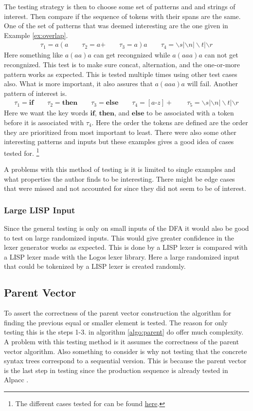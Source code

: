 \documentclass[a4paper,12pt]{article}
\theoremstyle{definition}
\begin{document}
The testing strategy is then to choose some set of patterns and and strings of interest. Then compare if the sequence of tokens with their spans are the same. One of the set of patterns that was deemed interesting are the one given in Example \ref{ex:overlap}.
\begin{align*}
  \tau_1 = a(a \qquad \tau_2 = a\text{+} \qquad \tau_3 = a)a \qquad \tau_4 = \backslash s|\backslash n |\backslash t | \backslash r
\end{align*}
Here something like $a(aa)a$ can get recongnized while $a(aaa)a$ can not get recongnized. This test is to make sure concat, alternation, and the one-or-more pattern works as expected. This is tested multiple times using other test cases also. What is more important, it also assures that $a(aaa)a$ will fail. Another pattern of interest is.
\begin{align*}
  \tau_1 = \mathbf{if} \qquad \tau_2 = \mathbf{then} \qquad \tau_3 = \mathbf{else} \qquad \tau_4 = [a\text{-}z]+ \qquad \tau_5 = \backslash s|\backslash n |\backslash t | \backslash r
\end{align*}
Here we want the key words $\mathbf{if}$, $\mathbf{then}$, and $\mathbf{else}$ to be associated with a token before it is associated with $\tau_4$. Here the order the tokens are defined are the order they are prioritized from most important to least. There were also some other interesting patterns and inputs but these examples gives a good idea of cases tested for. \footnote{The different cases tested for can be found \href{https://github.com/diku-dk/alpacc/tree/20b98004bb18bfd7d8031ffaf053f382f821889a/futhark-tests/lexer-tests}{here}.}

A problems with this method of testing is it is limited to single examples and what properties the author finds to be interesting. There might be edge cases that were missed and not accounted for since they did not seem to be of interest.
\subsubsection{Large LISP Input}
Since the general testing is only on small inputs of the DFA it would also be good to test on large randomized inputs. This would give greater confidence in the lexer generator works as expected. This is done by a LISP lexer is compared with a LISP lexer made with the Logos lexer library. Here a large randomized input that could be tokenized by a LISP lexer is created randomly.

\subsection{Parent Vector}
To assert the correctness of the parent vector construction the algorithm for finding the previous equal or smaller element is tested. The reason for only testing this is the steps 1-3. in algorithm \ref{algo:parent} do offer much complexity. A problem with this testing method is it assumes the correctness of the parent vector algorithm. Also something to consider is why not testing that the concrete syntax trees correspond to a sequential version. This is because the parent vector is the last step in testing since the production sequence is already tested in Alpacc \cite{due2023}.
\end{document}
